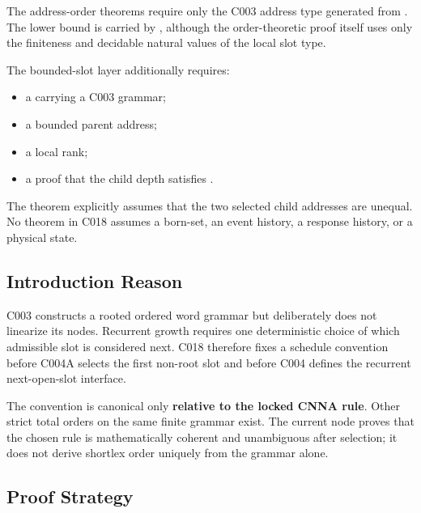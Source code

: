 The address-order theorems require only the C003 address type generated
from \texttt{\protect{}}. The lower bound \texttt{\protect{}} is
carried by \texttt{\protect{}}, although the order-theoretic
proof itself uses only the finiteness and decidable natural values of
the local slot type.

The bounded-slot layer additionally requires:

\begin{itemize}
\tightlist
\item
  a \texttt{\protect{}} carrying a C003 grammar;
\item
  a bounded parent address;
\item
  a local rank;
\item
  a proof that the child depth satisfies
  \texttt{\protect{}}.
\end{itemize}

The theorem \texttt{\protect{}}
explicitly assumes that the two selected child addresses are unequal. No
theorem in C018 assumes a born-set, an event history, a response
history, or a physical state.

\subsection{Introduction Reason}\label{introduction-reason-5}

C003 constructs a rooted ordered word grammar but deliberately does not
linearize its nodes. Recurrent growth requires one deterministic choice
of which admissible slot is considered next. C018 therefore fixes a
schedule convention before C004A selects the first non-root slot and
before C004 defines the recurrent next-open-slot interface.

The convention is canonical only \textbf{relative to the locked CNNA
rule}. Other strict total orders on the same finite grammar exist. The
current node proves that the chosen rule is mathematically coherent and
unambiguous after selection; it does not derive shortlex order uniquely
from the grammar alone.

\subsection{Proof Strategy}\label{proof-strategy}

